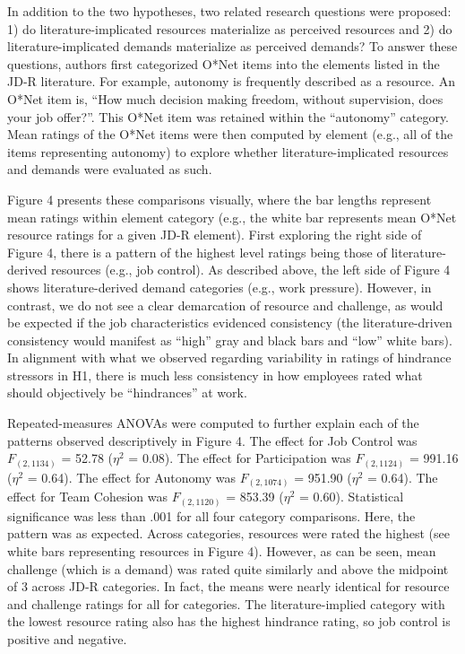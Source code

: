 \documentclass[
  man,mask]{apa6}
\begin{document}
In addition to the two hypotheses, two related research questions were proposed: 1) do literature-implicated resources materialize as perceived resources and 2) do literature-implicated demands materialize as perceived demands? To answer these questions, authors first categorized O*Net items into the elements listed in the JD-R literature. For example, autonomy is frequently described as a resource. An O*Net item is, ``How much decision making freedom, without supervision, does your job offer?''. This O*Net item was retained within the ``autonomy'' category. Mean ratings of the O*Net items were then computed by element (e.g., all of the items representing autonomy) to explore whether literature-implicated resources and demands were evaluated as such.

Figure 4 presents these comparisons visually, where the bar lengths represent mean ratings within element category (e.g., the white bar represents mean O*Net resource ratings for a given JD-R element). First exploring the right side of Figure 4, there is a pattern of the highest level ratings being those of literature-derived resources (e.g., job control). As described above, the left side of Figure 4 shows literature-derived demand categories (e.g., work pressure). However, in contrast, we do not see a clear demarcation of resource and challenge, as would be expected if the job characteristics evidenced consistency (the literature-driven consistency would manifest as ``high'' gray and black bars and ``low'' white bars). In alignment with what we observed regarding variability in ratings of hindrance stressors in H1, there is much less consistency in how employees rated what should objectively be ``hindrances'' at work.

Repeated-measures ANOVAs were computed to further explain each of the patterns observed descriptively in Figure 4. The effect for Job Control was \(F_{(2, 1134)}\) = 52.78 (\(\eta^2\) = 0.08).
The effect for Participation was \(F_{(2, 1124)}\) = 991.16 (\(\eta^2\) = 0.64).
The effect for Autonomy was \(F_{(2, 1074)}\) = 951.90 (\(\eta^2\) = 0.64).
The effect for Team Cohesion was \(F_{(2, 1120)}\) = 853.39 (\(\eta^2\) = 0.60). Statistical significance was less than .001 for all four category comparisons. Here, the pattern was as expected. Across categories, resources were rated the highest (see white bars representing resources in Figure 4). However, as can be seen, mean challenge (which is a demand) was rated quite similarly and above the midpoint of 3 across JD-R categories. In fact, the means were nearly identical for resource and challenge ratings for all for categories. The literature-implied category with the lowest resource rating also has the highest hindrance rating, so job control is positive and negative.
\end{document}
